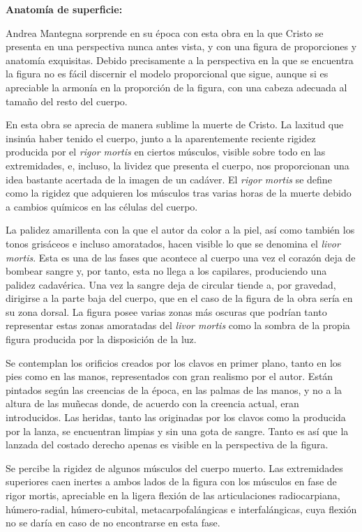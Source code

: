 \vspace{12pt}
\textbf{Anatomía de superficie:}

Andrea Mantegna sorprende en su época con esta obra en la que Cristo se presenta en una perspectiva nunca antes vista, y con una figura de proporciones y anatomía exquisitas. Debido precisamente a la perspectiva en la que se encuentra la figura no es fácil discernir el modelo proporcional que sigue, aunque si es apreciable la armonía en la proporción de la figura, con una cabeza adecuada al tamaño del resto del cuerpo.

En esta obra se aprecia de manera sublime la muerte de Cristo. La laxitud que insinúa haber tenido el cuerpo, junto a la aparentemente reciente rigidez producida por el \textit{rigor mortis} en ciertos músculos, visible sobre todo en las extremidades, e, incluso, la lividez que presenta el cuerpo, nos proporcionan una idea bastante acertada de la imagen de un cadáver. El \textit{rigor mortis} se define como la rigidez que adquieren los músculos tras varias horas de la muerte debido a cambios químicos en las células del cuerpo.

La palidez amarillenta con la que el autor da color a la piel, así como también los tonos grisáceos e incluso amoratados, hacen visible lo que se denomina el \textit{livor mortis}. Esta es una de las fases que acontece al cuerpo una vez el corazón deja de bombear sangre y, por tanto, esta no llega a los capilares, produciendo una palidez cadavérica. Una vez la sangre deja de circular tiende a, por gravedad, dirigirse a la parte baja del cuerpo, que en el caso de la figura de la obra sería en su zona dorsal. La figura posee varias zonas más oscuras que podrían tanto representar estas zonas amoratadas del \textit{livor mortis} como la sombra de la propia figura producida por la disposición de la luz.

Se contemplan los orificios creados por los clavos en primer plano, tanto en los pies como en las manos, representados con gran realismo por el autor. Están pintados según las creencias de la época, en las palmas de las manos, y no a la altura de las muñecas donde, de acuerdo con la creencia actual, eran introducidos.
Las heridas, tanto las originadas por los clavos como la producida por la lanza, se encuentran limpias y sin una gota de sangre. Tanto es así que la lanzada del costado derecho apenas es visible en la perspectiva de la figura. 

Se percibe la rigidez de algunos músculos del cuerpo muerto. Las extremidades superiores caen inertes a ambos lados de la figura con los músculos en fase de rigor mortis, apreciable en la ligera flexión de las articulaciones radiocarpiana, húmero-radial, húmero-cubital, metacarpofalángicas e interfalángicas, cuya flexión no se daría en caso de no encontrarse en esta fase.

